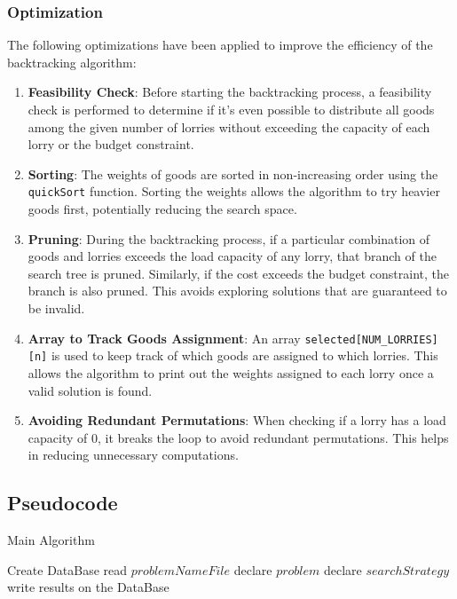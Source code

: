 \documentclass{article}
\begin{document}
\subsubsection{Optimization}
The following optimizations have been applied to improve the efficiency of the backtracking algorithm:
\begin{enumerate}
	\item \textbf{Feasibility Check}: Before starting the backtracking process, a feasibility check is performed to determine if it's even possible to distribute all goods among the given number of lorries without exceeding the capacity of each lorry or the budget constraint.

	\item \textbf{Sorting}: The weights of goods are sorted in non-increasing order using the \texttt{quickSort} function. Sorting the weights allows the algorithm to try heavier goods first, potentially reducing the search space.

	\item \textbf{Pruning}: During the backtracking process, if a particular combination of goods and lorries exceeds the load capacity of any lorry, that branch of the search tree is pruned. Similarly, if the cost exceeds the budget constraint, the branch is also pruned. This avoids exploring solutions that are guaranteed to be invalid.

	\item \textbf{Array to Track Goods Assignment}: An array \texttt{selected[NUM\_LORRIES][n]} is used to keep track of which goods are assigned to which lorries. This allows the algorithm to print out the weights assigned to each lorry once a valid solution is found.

	\item \textbf{Avoiding Redundant Permutations}: When checking if a lorry has a load capacity of 0, it breaks the loop to avoid redundant permutations. This helps in reducing unnecessary computations.
\end{enumerate}

\subsection{Pseudocode}
\begin{algorithm}
	\caption{Main Algorithm}
	\label{algo:main}
	\begin{algorithmic}[1]
		\State Create DataBase
				\State read $problemNameFile$
				\State declare $problem$
				\State declare $searchStrategy$
				\State {}
				\State write results on the DataBase
			\EndFor
		\EndFor
		\EndFunction
	\end{algorithmic}
\end{algorithm}
\end{document}
